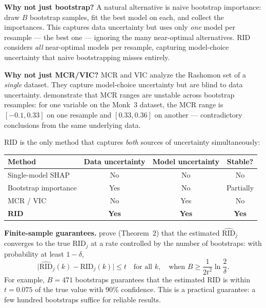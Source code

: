 \textbf{Why not just bootstrap?}  A natural alternative is naive bootstrap
importance: draw $B$ bootstrap samples, fit the best model on each, and
collect the importances.  This captures data uncertainty but uses only
\emph{one} model per resample --- the best one --- ignoring the many
near-optimal alternatives.  RID considers \emph{all} near-optimal models
per resample, capturing model-choice uncertainty that naive bootstrapping
misses entirely.

\textbf{Why not just MCR/VIC?}  MCR and VIC analyze the Rashomon set of a
\emph{single} dataset.  They capture model-choice uncertainty but are
blind to data uncertainty.  \citet{DonnellyEtAl2023} demonstrate that MCR
ranges are unstable across bootstrap resamples: for one variable on the
Monk~3 dataset, the MCR range is $[-0.1, 0.33]$ on one resample and
$[0.33, 0.36]$ on another --- contradictory conclusions from the same
underlying data.

\begin{keyidea}[RID = Bootstrap $\times$ Rashomon]
RID is the only method that captures \emph{both} sources of uncertainty
simultaneously:
\begin{center}
\begin{tabular}{lccc}
\toprule
\textbf{Method} & \textbf{Data uncertainty} & \textbf{Model uncertainty}
  & \textbf{Stable?} \\
\midrule
Single-model SHAP & No  & No  & No \\
Bootstrap importance & Yes & No  & Partially \\
MCR / VIC            & No  & Yes & No \\
\textbf{RID}         & \textbf{Yes} & \textbf{Yes} & \textbf{Yes} \\
\bottomrule
\end{tabular}
\end{center}
\end{keyidea}

\textbf{Finite-sample guarantees.}  \citet{DonnellyEtAl2023} prove
(Theorem~2) that the estimated $\widehat{\text{RID}}_j$ converges to the
true $\text{RID}_j$ at a rate controlled by the number of bootstraps:
with probability at least $1 - \delta$,
\[
  \bigl|\widehat{\text{RID}}_j(k) - \text{RID}_j(k)\bigr| \leq t
  \quad \text{for all } k,
  \quad \text{when } B \geq \frac{1}{2t^2}\ln\frac{2}{\delta}.
\]
For example, $B = 471$ bootstraps guarantees that the estimated RID is
within $t = 0.075$ of the true value with 90\% confidence.  This is a
practical guarantee: a few hundred bootstraps suffice for reliable results.

